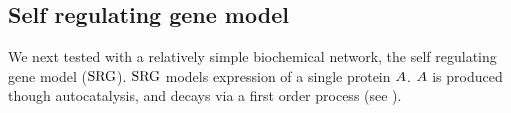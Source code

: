 \subsection{Self regulating gene model}
\label{sec:srg}

We next tested  with a relatively simple biochemical network, the self regulating gene model ($\text{SRG}$)\supercite{Roberts:2015iu}. $\text{SRG}$ models expression of a single protein $A$. $A$ is produced though autocatalysis, and decays via a first order process (see ).

